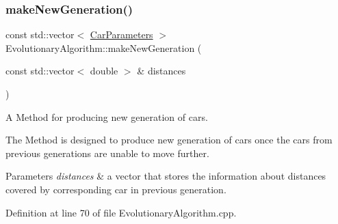 \subsubsection{\texorpdfstring{make\+New\+Generation()}{makeNewGeneration()}}
{\footnotesize\ttfamily const std\+::vector$<$ \hyperlink{classCarParameters}{Car\+Parameters} $>$ Evolutionary\+Algorithm\+::make\+New\+Generation (\begin{DoxyParamCaption}\item[{const std\+::vector$<$ double $>$ \&}]{distances }\end{DoxyParamCaption})}



A Method for producing new generation of cars. 

The Method is designed to produce new generation of cars once the cars from previous generations are unable to move further. 
\begin{DoxyParams}{Parameters}
{\em distances} & a vector that stores the information about distances covered by corresponding car in previous generation. \\
\hline
\end{DoxyParams}


Definition at line 70 of file Evolutionary\+Algorithm.\+cpp.


